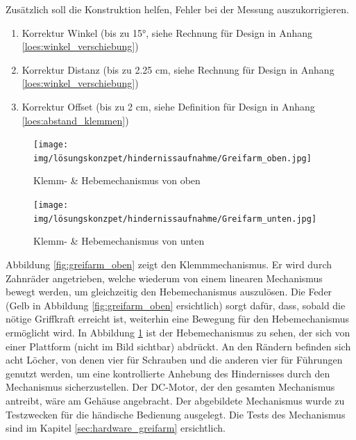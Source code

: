 \documentclass[../main.tex]{subfiles}
\begin{document}
Zusätzlich soll die Konstruktion helfen, Fehler bei der Messung auszukorrigieren.
\begin{enumerate}
    \item Korrektur Winkel (bis zu 15°, siehe Rechnung für Design in Anhang \ref{loes:winkel_verschiebung})
    \item Korrektur Distanz (bis zu 2.25 cm, siehe Rechnung für Design in Anhang \ref{loes:winkel_verschiebung})
    \item Korrektur Offset (bis zu 2 cm, siehe Definition für Design in Anhang \ref{loes:abstand_klemmen})
\end{enumerate}

\begin{figure}[h!]
    \centering
    \begin{minipage}[t]{0.45\textwidth}
        \centering
        \texttt{[image: img/lösungskonzpet/hindernissaufnahme/Greifarm\_oben.jpg]}
        \caption{Klemm- \& Hebemechanismus von oben}
        \label{fig:greifarm_oben}
    \end{minipage}
    \hfill
    \begin{minipage}[t]{0.45\textwidth}
        \centering
        \texttt{[image: img/lösungskonzpet/hindernissaufnahme/Greifarm\_unten.jpg]}
        \caption{Klemm- \& Hebemechanismus von unten}
        \label{fig:greifarm_unten}
    \end{minipage}
\end{figure}
\newpage
Abbildung \ref{fig:greifarm_oben} zeigt den Klemmmechanismus. Er wird durch Zahnräder angetrieben, welche wiederum von einem linearen Mechanismus bewegt werden, um gleichzeitig den Hebemechanismus auszulösen. Die Feder (Gelb in Abbildung \ref{fig:greifarm_oben} ersichtlich) sorgt dafür, dass, sobald die nötige Griffkraft erreicht ist, weiterhin eine Bewegung für den Hebemechanismus ermöglicht wird. In Abbildung \ref{fig:greifarm_unten} ist der Hebemechanismus zu sehen, der sich von einer Plattform (nicht im Bild sichtbar) abdrückt. An den Rändern befinden sich acht Löcher, von denen vier für Schrauben und die anderen vier für Führungen genutzt werden, um eine kontrollierte Anhebung des Hindernisses durch den Mechanismus sicherzustellen.
Der DC-Motor, der den gesamten Mechanismus antreibt, wäre am Gehäuse angebracht.
Der abgebildete Mechanismus wurde zu Testzwecken für die händische Bedienung ausgelegt. Die Tests des Mechanismus sind im Kapitel \ref{sec:hardware_greifarm} ersichtlich.
\end{document}
